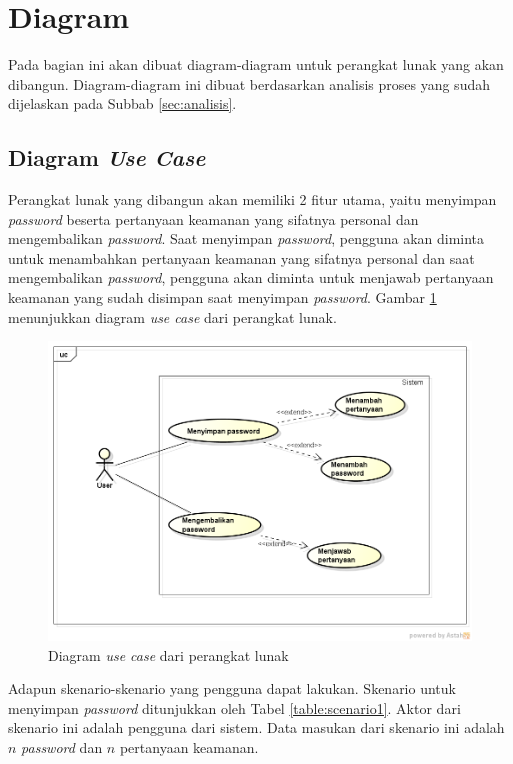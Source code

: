 \section{Diagram}

Pada bagian ini akan dibuat diagram-diagram untuk perangkat lunak yang akan dibangun. Diagram-diagram ini dibuat berdasarkan analisis proses yang sudah dijelaskan pada Subbab \ref{sec:analisis}.

\subsection{Diagram \textit{Use Case}}

Perangkat lunak yang dibangun akan memiliki 2 fitur utama, yaitu menyimpan \textit{password} beserta pertanyaan keamanan yang sifatnya personal dan mengembalikan \textit{password}. Saat menyimpan \textit{password}, pengguna akan diminta untuk menambahkan pertanyaan keamanan yang sifatnya personal dan saat mengembalikan \textit{password}, pengguna akan diminta untuk menjawab pertanyaan keamanan yang sudah disimpan saat menyimpan \textit{password}. Gambar \ref{fig:use_case} menunjukkan diagram \textit{use case} dari perangkat lunak.

\begin{figure}[H]
	\centerline{\includegraphics[scale=0.5]{Gambar/use_case}}
	\caption{Diagram \textit{use case} dari perangkat lunak}\label{fig:use_case}
\end{figure}

Adapun skenario-skenario yang pengguna dapat lakukan. Skenario untuk menyimpan \textit{password} ditunjukkan oleh Tabel \ref{table:scenario1}. Aktor dari skenario ini adalah pengguna dari sistem. Data masukan dari skenario ini adalah $n$ \textit{password} dan $n$ pertanyaan keamanan.

